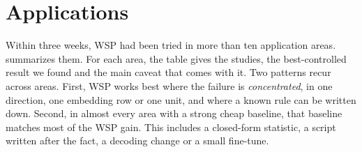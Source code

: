 \section{Applications}
\label{sec:apps}

Within three weeks, WSP had been tried in more than ten application areas.  summarizes them. For each area, the table gives the studies, the best-controlled result we found and the main caveat that comes with it. Two patterns recur across areas. First, WSP works best where the failure is \emph{concentrated}, in one direction, one embedding row or one unit, and where a known rule can be written down. Second, in almost every area with a strong cheap baseline, that baseline matches most of the WSP gain. This includes a closed-form statistic, a script written after the fact, a decoding change or a small fine-tune.

